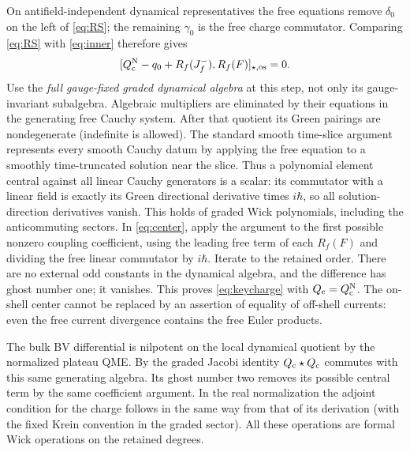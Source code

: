 On antifield-independent dynamical representatives the free equations remove \(\delta_0\) on the left of \eqref{eq:RS}; the remaining \(\gamma_0\) is the free charge commutator. Comparing \eqref{eq:RS} with \eqref{eq:inner} therefore gives
\begin{equation}\label{eq:center}
 [Q_{\mathrm c}^{\rm N}-q_0+R_f(J_f^-),R_f(F)]_{\star,{\rm os}}=0 .
\end{equation}
Use the \emph{full gauge-fixed graded dynamical algebra} at this step, not only its gauge-invariant subalgebra. Algebraic multipliers are eliminated by their equations in the generating free Cauchy system. After that quotient its Green pairings are nondegenerate (indefinite is allowed). The standard smooth time-slice argument represents every smooth Cauchy datum by applying the free equation to a smoothly time-truncated solution near the slice. Thus a polynomial element central against all linear Cauchy generators is a scalar: its commutator with a linear field is exactly its Green directional derivative times \(i\hbar\), so all solution-direction derivatives vanish. This holds of graded Wick polynomials, including the anticommuting sectors. In \eqref{eq:center}, apply the argument to the first possible nonzero coupling coefficient, using the leading free term of each \(R_f(F)\) and dividing the free linear commutator by \(i\hbar\). Iterate to the retained order. There are no external odd constants in the dynamical algebra, and the difference has ghost number one; it vanishes. This proves \eqref{eq:keycharge} with \(Q_{\mathrm c}=Q_{\mathrm c}^{\rm N}\). The on-shell center cannot be replaced by an assertion of equality of off-shell currents: even the free current divergence contains the free Euler products.

The bulk BV differential is nilpotent on the local dynamical quotient by the normalized plateau QME. By the graded Jacobi identity \(Q_{\mathrm c}\star Q_{\mathrm c}\) commutes with this same generating algebra. Its ghost number two removes its possible central term by the same coefficient argument. In the real normalization the adjoint condition for the charge follows in the same way from that of its derivation (with the fixed Krein convention in the graded sector). All these operations are formal Wick operations on the retained degrees.

